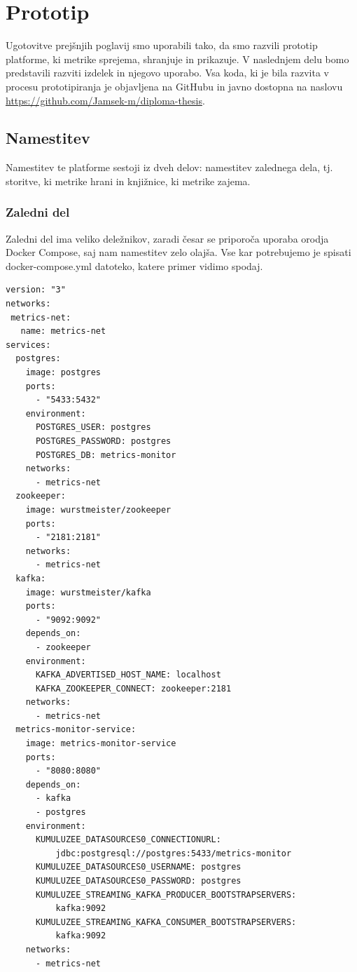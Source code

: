 \documentclass[a4paper, 12pt]{book}
\begin{document}
\section{Prototip}
\label{ch3:sec3}

Ugotovitve prejšnjih poglavij smo uporabili tako, da smo razvili prototip platforme, ki metrike sprejema, shranjuje in prikazuje. V naslednjem delu bomo predstavili razviti izdelek in njegovo uporabo. Vsa koda, ki je bila razvita v procesu prototipiranja je objavljena na GitHubu in javno dostopna na naslovu \url{https://github.com/Jamsek-m/diploma-thesis}.

\subsection{Namestitev}
\label{ch3:sec3:sub1}

Namestitev te platforme sestoji iz dveh delov: namestitev zalednega dela, tj. storitve, ki metrike hrani in knjižnice, ki metrike zajema.

\subsubsection{Zaledni del}

Zaledni del ima veliko deležnikov, zaradi česar se priporoča uporaba orodja Docker Compose, saj nam namestitev zelo olajša. Vse kar potrebujemo je spisati docker-compose.yml datoteko, katere primer vidimo spodaj.

\begin{lstlisting}[label=code:docker_compose, caption=Primer datoteke docker-compose.yml]
version: "3"
networks:
 metrics-net:
   name: metrics-net
services:
  postgres:
    image: postgres
    ports:
      - "5433:5432"
    environment:
      POSTGRES_USER: postgres
      POSTGRES_PASSWORD: postgres
      POSTGRES_DB: metrics-monitor
    networks:
      - metrics-net
  zookeeper:
    image: wurstmeister/zookeeper
    ports:
      - "2181:2181"
    networks:
      - metrics-net
  kafka:
    image: wurstmeister/kafka
    ports:
      - "9092:9092"
    depends_on:
      - zookeeper
    environment:
      KAFKA_ADVERTISED_HOST_NAME: localhost
      KAFKA_ZOOKEEPER_CONNECT: zookeeper:2181
    networks:
      - metrics-net
  metrics-monitor-service:
    image: metrics-monitor-service
    ports:
      - "8080:8080"
    depends_on:
      - kafka
      - postgres
    environment:
      KUMULUZEE_DATASOURCES0_CONNECTIONURL:
          jdbc:postgresql://postgres:5433/metrics-monitor
      KUMULUZEE_DATASOURCES0_USERNAME: postgres
      KUMULUZEE_DATASOURCES0_PASSWORD: postgres
      KUMULUZEE_STREAMING_KAFKA_PRODUCER_BOOTSTRAPSERVERS:
          kafka:9092
      KUMULUZEE_STREAMING_KAFKA_CONSUMER_BOOTSTRAPSERVERS:
          kafka:9092
    networks:
      - metrics-net
\end{lstlisting}
\end{document}
